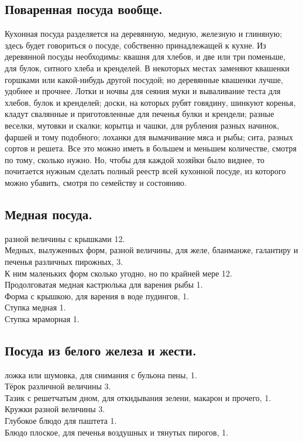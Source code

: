 \subsection{Поваренная посуда вообще.}
Кухонная посуда разделяется на деревянную, медную, железную и глиняную; здесь будет говориться о посуде, собственно принадлежащей к кухне. Из деревянной посуды необходимы: квашня для хлебов, и две или три поменьше, для булок, ситного хлеба и кренделей. В некоторых местах заменяют квашенки горшками или какой-нибудь другой посудой; но деревянные квашенки лучше, удобнее и прочнее. Лотки и ночвы для сеяния муки и вываливание теста для хлебов, булок и кренделей; доски, на которых рубят говядину, шинкуют коренья, кладут свалянные и приготовленные для печенья булки и крендели; разные веселки, мутовки и скалки; корытца и чашки, для рубления разных начинок, фаршей и тому подобного; лоханки для вымачивание мяса и рыбы; сита, разных сортов и решета. Все это можно иметь в большем и меньшем количестве, смотря по тому, сколько нужно. Но, чтобы для каждой хозяйки было виднее, то почитается нужным сделать полный реестр всей кухонной посуде, из которого можно убавить, смотря по семейству и состоянию.

\subsection{Медная посуда.}
 разной величины с крышками 12.\\
Медных, вылуженных форм, разной величины, для желе, бланманже, галантиру и печенья различных пирожных, 3.\\
К ним маленьких форм сколько угодно, но по крайней мере 12.\\
Продолговатая медная кастрюлька для варения рыбы 1.\\
Форма с крышкою, для варения в воде пудингов, 1.\\
Ступка медная 1.\\
Ступка мраморная 1.\\

\subsection{Посуда из белого железа и жести.}
 ложка или шумовка, для снимания с бульона пены, 1.\\
Тёрок различной величины 3.\\
Тазик с решетчатым дном, для откидывания зелени, макарон и прочего, 1.\\
Кружки разной величины 3.\\
Глубокое блюдо для паштета 1.\\
Блюдо плоское, для печенья воздушных и тянутых пирогов, 1.\\

